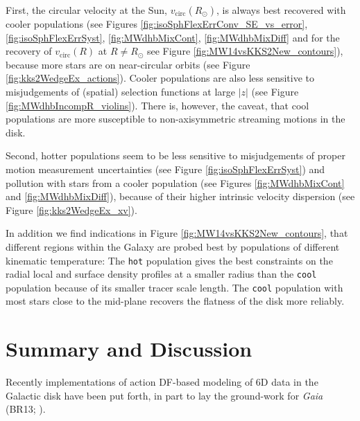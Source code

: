 \documentclass[iop,revtex4,numberedappendix,appendixfloats]{emulateapj}
\begin{document}
First, the circular velocity at the Sun, $v_\text{circ}(R_\odot)$, is always best recovered with cooler populations (see Figures \ref{fig:isoSphFlexErrConv_SE_vs_error}, \ref{fig:isoSphFlexErrSyst}, \ref{fig:MWdhbMixCont}, \ref{fig:MWdhbMixDiff} and for the recovery of $v_\text{circ}(R)$ at $R \neq R_\odot$ see Figure \ref{fig:MW14vsKKS2New_contours}), because more stars are on near-circular orbits (see Figure \ref{fig:kks2WedgeEx_actions}). Cooler populations are also less sensitive to misjudgements of (spatial) selection functions at large $|z|$ (see Figure \ref{fig:MWdhbIncompR_violins}). There is, however, the caveat, that cool populations are more susceptible to non-axisymmetric streaming motions in the disk.

Second, hotter populations seem to be less sensitive to misjudgements of proper motion measurement uncertainties (see Figure \ref{fig:isoSphFlexErrSyst}) and pollution with stars from a cooler population (see Figures \ref{fig:MWdhbMixCont} and \ref{fig:MWdhbMixDiff}), because of their higher intrinsic velocity dispersion (see Figure \ref{fig:kks2WedgeEx_xv}).

In addition we find indications in Figure \ref{fig:MW14vsKKS2New_contours}, that different regions within the Galaxy are probed best by populations of different kinematic temperature: The \texttt{hot} population gives the best constraints on the radial local and surface density profiles at a smaller radius than the \texttt{cool} population because of its smaller tracer scale length. The \texttt{cool} population with most stars close to the mid-plane recovers the flatness of the disk more reliably.

\section{Summary and Discussion} \label{sec:discussionsummary}

Recently implementations of action DF-based modeling of 6D data in the Galactic disk have been put forth, in part to lay the ground-work for \emph{Gaia} (BR13; \citealt{2013MNRAS.433.1411M,2014MNRAS.445.3133P,2015MNRAS.449.3479S}).
\end{document}
